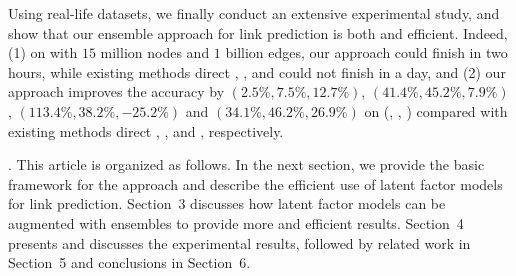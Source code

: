 Using real-life datasets, we finally conduct an extensive experimental study,
and show that our ensemble approach for link prediction is both  and efficient.
Indeed, (1) on \Friendster with $15$ million nodes and $1$ billion edges, our approach could finish in
two hours, while existing methods direct \NMF, \Aa \cite{adamic},  
and \BIGCLAM \cite{yang-wsdm2013} could not finish in a day, and
(2) our approach improves the accuracy by $(2.5\%, 7.5\%, 12.7\%)$, $(41.4\%, 45.2\%, 7.9\%)$, $(113.4\%, 38.2\%, -25.2\%)$ and $(34.1\%, 46.2\%, 26.9\%)$ on (\Digg, \YouTube, \Wikipedia)
compared with existing methods  direct \NMF, \Aa, \RA and \BIGCLAM, respectively.


. This article is organized as follows. In the next section, we  provide
the basic framework for the approach and describe the efficient use
of  latent factor models for link prediction. Section~3 discusses
how latent factor models can be augmented with ensembles to provide
more  and efficient results. Section~4 presents and discusses the
experimental results, followed by related work in Section~5 and conclusions in Section~6.

